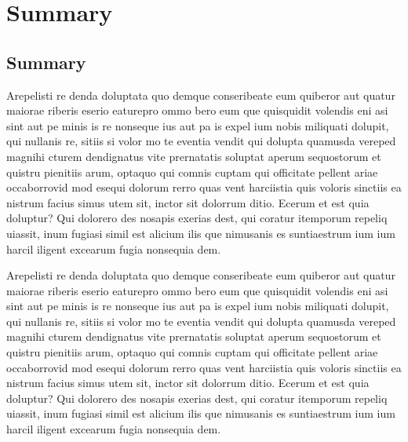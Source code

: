 \chapter{Summary}
\label{cha:Summary}


\section{Summary}
\label{sec:Summary}
Arepelisti re denda doluptata quo demque conseribeate eum quiberor aut quatur maiorae riberis eserio eaturepro ommo bero eum que quisquidit volendis eni asi sint aut pe minis is re nonseque ius aut pa is expel ium nobis miliquati dolupit, qui nullanis re, sitiis si volor mo te eventia vendit qui dolupta quamusda vereped magnihi cturem dendignatus vite prernatatis soluptat aperum sequostorum et quistru pienitiis arum, optaquo qui comnis cuptam qui officitate pellent ariae occaborrovid mod esequi dolorum rerro quas vent harciistia quis voloris sinctiis ea nistrum facius simus utem sit, inctor sit dolorrum ditio. Ecerum et est quia doluptur? Qui dolorero des nosapis exerias dest, qui coratur itemporum repeliq uiassit, inum fugiasi simil est alicium ilis que nimusanis es suntiaestrum ium ium harcil iligent excearum fugia nonsequia dem.

Arepelisti re denda doluptata quo demque conseribeate eum quiberor aut quatur maiorae riberis eserio eaturepro ommo bero eum que quisquidit volendis eni asi sint aut pe minis is re nonseque ius aut pa is expel ium nobis miliquati dolupit, qui nullanis re, sitiis si volor mo te eventia vendit qui dolupta quamusda vereped magnihi cturem dendignatus vite prernatatis soluptat aperum sequostorum et quistru pienitiis arum, optaquo qui comnis cuptam qui officitate pellent ariae occaborrovid mod esequi dolorum rerro quas vent harciistia quis voloris sinctiis ea nistrum facius simus utem sit, inctor sit dolorrum ditio. Ecerum et est quia doluptur? Qui dolorero des nosapis exerias dest, qui coratur itemporum repeliq uiassit, inum fugiasi simil est alicium ilis que nimusanis es suntiaestrum ium ium harcil iligent excearum fugia nonsequia dem.

